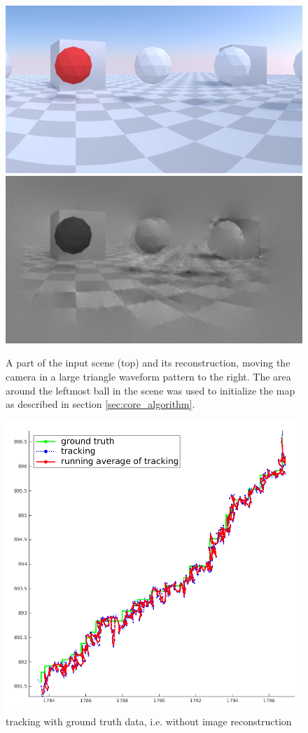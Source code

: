\begin{figure}
\includegraphics[width=\columnwidth]{images/zigzag_input.png}
\includegraphics[width=\columnwidth]{images/zigzag_reconstruction.png}
\caption{A part of the input scene (top) and its reconstruction,
moving the camera in a large triangle waveform pattern to the right.
The area around the leftmost ball in the scene was used to initialize
the map as described in section \ref{sec:core_algorithm}.}
\label{fig:zigzag_reconstruction}
\end{figure}

\begin{figure}
\includegraphics[width=\columnwidth]{images/tracking_without_reconstruction.png}
\caption{tracking with ground truth data, i.e. without image reconstruction}
\label{fig:tracking_groundtruth}
\end{figure}
